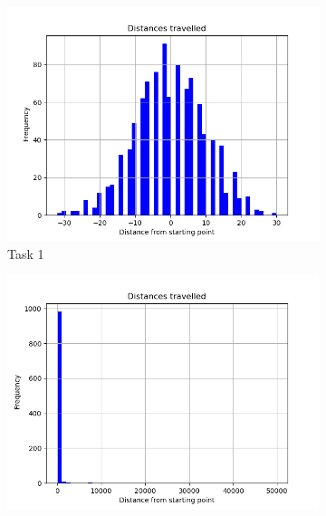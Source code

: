 \documentclass{article}
\begin{document}
    \begin{figure}
        \centering
            \begin{subfigure}[b]{0.5\textwidth}            
                    \includegraphics[width=\textwidth]{Graphs/task1.png}
                    \caption{Task 1}
            \end{subfigure}%
            \begin{subfigure}[b]{0.5\textwidth}
                    \centering
                    \includegraphics[width=\textwidth]{Graphs/task2.png}

\end{subfigure}
\end{figure}
\end{document}
